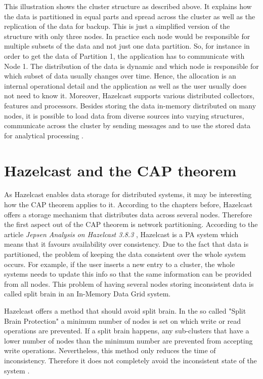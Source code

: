 This illustration shows the cluster structure as described above. It explains how the data is partitioned in equal parts and spread across the cluster as well as the replication of the data for backup. This is just a simplified version of the structure with only three nodes. In practice each node would be responsible for multiple subsets of the data and not just one data partition. So, for instance in order to get the data of Partition 1, the application has to communicate with Node 1. The distribution of the data is dynamic and which node is responsible for which subset of data usually changes over time. Hence, the allocation is an internal operational detail and the application as well as the user usually does not need to know it.
Moreover, Hazelcast supports various distributed collectors, features and processors. Besides storing the data in-memory distributed on many nodes, it is possible to load data from diverse sources into varying structures, communicate across the cluster by sending messages and to use the stored data for analytical processing \parencite{johns2015}.


\section{Hazelcast and the CAP theorem}
As Hazelcast enables data storage for distributed systems, it may be interesting how the CAP theorem applies to it. According to the chapters before, Hazelcast offers a storage mechanism that distributes data across several nodes. Therefore the first aspect out of the CAP theorem is network partitioning. According to the article \textit{Jepsen Analysis on Hazelcast 3.8.3} \parencite{hazelcastCP}, Hazelcast is a PA system which means that it favours availability over consistency. Due to the fact that data is partitioned, the problem of keeping the data consistent over the whole system occurs. For example, if the user inserts a new entry to a cluster, the whole systems needs to update this info so that the same information can be provided from all nodes. This problem of having several nodes storing inconsistent data is called split brain in an In-Memory Data Grid system.

Hazelcast offers a method that should avoid split brain. In the so called "Split Brain Protection" a minimum number of nodes is set on which write or read operations are prevented. If a split brain happens, any sub-clusters that have a lower number of nodes than the minimum number are prevented from accepting write operations. Nevertheless, this method only reduces the time of inconsistency. Therefore it does not completely avoid the inconsistent state of the system \parencite{hazelcastCP}.

